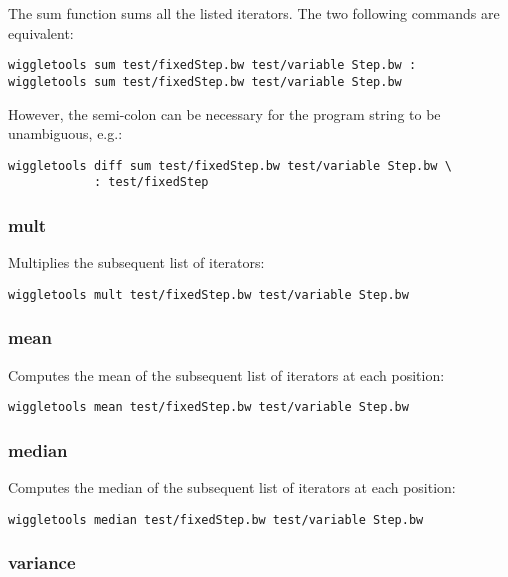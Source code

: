 \documentclass[12pt]{article}
\begin{document}
The sum function sums all the listed iterators. The two following commands are equivalent:

\begin{verbatim}
wiggletools sum test/fixedStep.bw test/variable Step.bw :
wiggletools sum test/fixedStep.bw test/variable Step.bw
\end{verbatim}

However, the semi-colon can be necessary for the program string to be unambiguous, e.g.:

\begin{verbatim}
wiggletools diff sum test/fixedStep.bw test/variable Step.bw \
            : test/fixedStep
\end{verbatim}

\subsubsection{mult}

Multiplies the subsequent list of iterators:

\begin{verbatim}
wiggletools mult test/fixedStep.bw test/variable Step.bw 
\end{verbatim}

\subsubsection{mean}

Computes the mean of the subsequent list of iterators at each position:

\begin{verbatim}
wiggletools mean test/fixedStep.bw test/variable Step.bw 
\end{verbatim}

\subsubsection{median}

Computes the median of the subsequent list of iterators at each position:

\begin{verbatim}
wiggletools median test/fixedStep.bw test/variable Step.bw 
\end{verbatim}

\subsubsection{variance}
\end{document}
